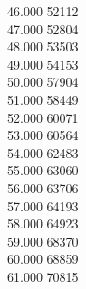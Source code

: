 { 46.000	52112 \\
 47.000	52804 \\
 48.000	53503 \\
 49.000	54153 \\
 50.000	57904 \\
 51.000	58449 \\
 52.000	60071 \\
 53.000	60564 \\
 54.000	62483 \\
 55.000	63060 \\
 56.000	63706 \\
 57.000	64193 \\
 58.000	64923 \\
 59.000	68370 \\
 60.000	68859 \\
 61.000	70815 \\
}
